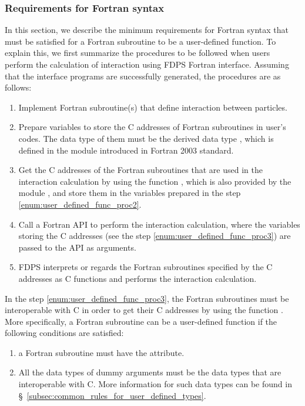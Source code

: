 \subsubsection{Requirements for Fortran syntax}
\label{s2sec:requirements_for_ftn_grammer_for_udt_func}
In this section, we describe the minimum requirements for Fortran syntax that must be satisfied for a Fortran subroutine to be a user-defined function. To explain this, we first summarize the procedures to be followed when users perform the calculation of interaction using FDPS Fortran interface. Assuming that the interface programs are successfully generated, the procedures are as follows:
\begin{enumerate}[leftmargin=*,itemsep=-1ex,label=(\Roman*)]
\item Implement Fortran subroutine(s) that define interaction between particles.
\item Prepare variables to store the C addresses of Fortran subroutines in user's codes. The data type of them must be the derived data type , which is defined in the module  introduced in Fortran 2003 standard. \label{enum:user_defined_func_proc2}
\item Get the C addresses of the Fortran subroutines that are used in the interaction calculation by using the function , which is also provided by the module , and store them in the variables prepared in the step \ref{enum:user_defined_func_proc2}. \label{enum:user_defined_func_proc3}
\item Call a Fortran API to perform the interaction calculation, where the variables storing the C addresses (see the step \ref{enum:user_defined_func_proc3}) are passed to the API as arguments.
\item FDPS interprets or regards the Fortran subroutines specified by the C addresses as C functions and performs the interaction calculation.
\end{enumerate}
In the step \ref{enum:user_defined_func_proc3}, the Fortran subroutines must be interoperable with C in order to get their C addresses by using the function . More specifically, a Fortran subroutine can be a user-defined function if the following conditions are satisfied:
\begin{enumerate}[leftmargin=*,itemsep=-1ex,label=(\arabic*)]
\item a Fortran subroutine must have the  attribute.
\item All the data types of dummy arguments must be the data types that are interoperable with C. More information for such data types can be found in \S~\ref{subsec:common_rules_for_user_defined_types}.
\end{enumerate}

